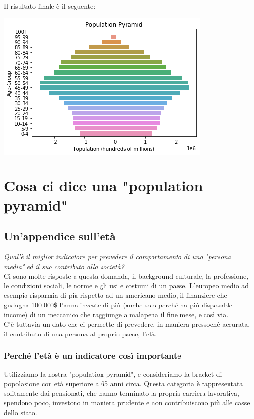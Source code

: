 \documentclass[11pt, oneside]{article}   	%
\begin{document}
Il risultato finale è il seguente:
\begin{center}
\includegraphics[scale=1]{popitaly5}
\end{center}

\section{Cosa ci dice una "population pyramid"}
\subsection{Un'appendice sull'età}
\emph{Qual'è il miglior indicatore per prevedere il comportamento di una "persona media" ed il suo contributo alla società?}\\
Ci sono molte risposte a questa domanda, il background culturale, la professione, le condizioni sociali, le norme e gli usi e costumi di un paese. L'europeo medio ad esempio risparmia di più rispetto ad un americano medio, il finanziere che gudagna 100.000\$ l'anno investe di più (anche solo perché ha più disposable income) di un meccanico che raggiunge a malapena il fine mese, e così via.\\
C'è tuttavia un dato che ci permette di prevedere, in maniera pressoché accurata, il contributo di una persona al proprio paese, l'età.

\subsubsection{Perché l'età è un indicatore così importante}
Utilizziamo la nostra "population pyramid", e consideriamo la bracket di popolazione con età superiore a 65 anni circa. Questa categoria è rappresentata solitamente dai pensionati, che hanno terminato la propria carriera lavorativa, spendono poco, investono in maniera prudente e non contribuiscono più alle casse dello stato. \\
\end{document}
